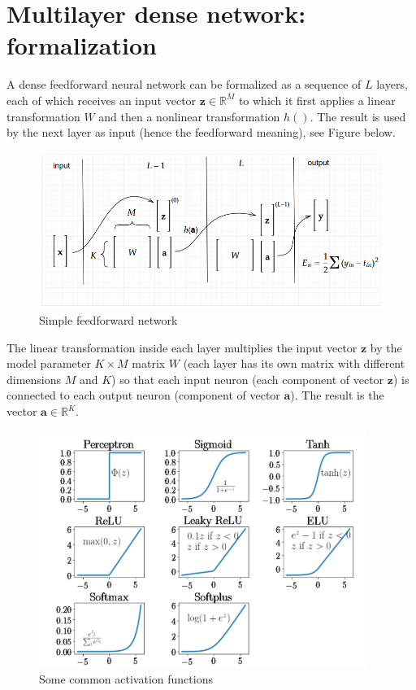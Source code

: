 \documentclass{article}
\begin{document}
\section{Multilayer dense network: formalization}
A dense feedforward neural network can be formalized as a sequence of $\displaystyle L$ layers, each of which receives an input vector $\displaystyle \mathbf{z} \in \mathbb{R}^{M}$ to which it first applies a linear transformation $\displaystyle W$ and then a nonlinear transformation $\displaystyle h()$. The result is used by the next layer as input (hence the feedforward meaning), see Figure below.

\begin{figure}[H]
    \centering
    \includegraphics[width=0.8\linewidth]{images/multi layers network.png}
    \caption{Simple feedforward network}
    \label{fig:multi-layer-network}
\end{figure}

The linear transformation inside each layer multiplies the input vector $\displaystyle \mathbf{z}$ by the model parameter $\displaystyle K\times M$ matrix $\displaystyle W$ (each layer has its own matrix with different dimensions $M$ and $K$) so that each input neuron (each component of vector $\displaystyle \mathbf{z}$) is connected to each output neuron (component of vector $\displaystyle \mathbf{a}$). The result is the vector $\displaystyle \mathbf{a} \in \mathbb{R}^{K}$.

\begin{figure}[H]
    \centering
    \includegraphics[width=0.6\linewidth]{images/activation functions.png}
    \caption{Some common activation functions}

\end{figure}
\end{document}
